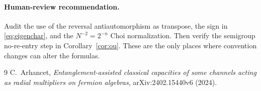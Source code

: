 \documentclass[11pt]{article}
\begin{document}
\paragraph{Human-review recommendation.}
Audit the use of the reversal antiautomorphism as transpose, the sign in
\eqref{eq:eigenchar}, and the $N^{-2}=2^{-n}$ Choi normalization.  Then verify
the semigroup no-re-entry step in Corollary~\ref{cor:ou}.  These are the only
places where convention changes can alter the formulas.

\begin{thebibliography}{9}
C.~Arhancet,
\emph{Entanglement-assisted classical capacities of some channels acting as
radial multipliers on fermion algebras}, arXiv:2402.15440v6 (2024).
\end{thebibliography}
\end{document}
